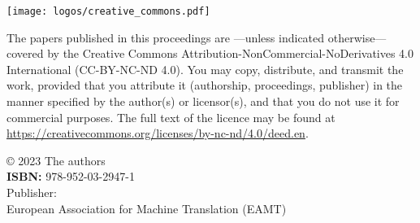 \documentclass[a4paper,11pt,twoside]{book}
\begin{document}
\thispagestyle{empty}
\vfill \mbox{} \vfill

\begin{onehalfspacing}

\noindent \texttt{[image: logos/creative\_commons.pdf]} 
\vspace{1em}

\noindent 
The papers published in this proceedings are ---unless indicated
otherwise--- covered by the Creative Commons
Attribution-NonCommercial-NoDerivatives 4.0 International (CC-BY-NC-ND
4.0). You may copy, distribute, and transmit the work, provided that
you attribute it (authorship, proceedings, publisher) in the manner
specified by the author(s) or licensor(s), and that you do not use it
for commercial purposes. The full text of the licence may be found at
\url{https://creativecommons.org/licenses/by-nc-nd/4.0/deed.en}.

\vspace{1cm}

\noindent © 2023 The authors\\
\noindent \textbf{ISBN:} 978-952-03-2947-1\\ 
\noindent Publisher:\\
\noindent European Association for Machine Translation (EAMT)\\

\end{onehalfspacing}
\thispagestyle{empty}
\vfill \mbox{}


\frontmatter

\tableofcontents
\end{document}
